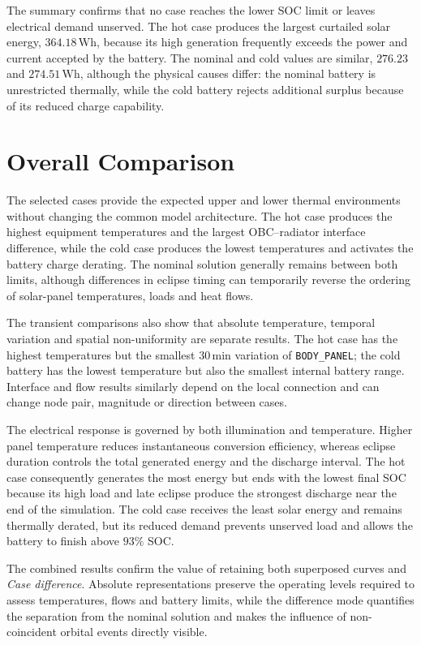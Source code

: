 The summary confirms that no case reaches the lower SOC limit or leaves
electrical demand unserved. The hot case produces the largest curtailed solar
energy, $364.18\,\mathrm{Wh}$, because its high generation frequently exceeds
the power and current accepted by the battery. The nominal and cold values are
similar, $276.23$ and $274.51\,\mathrm{Wh}$, although the physical causes
differ: the nominal battery is unrestricted thermally, while the cold battery
rejects additional surplus because of its reduced charge capability.


\section{Overall Comparison}
\label{sec:overall_comparison}

The selected cases provide the expected upper and lower thermal environments
without changing the common model architecture. The hot case produces the
highest equipment temperatures and the largest OBC--radiator interface
difference, while the cold case produces the lowest temperatures and activates
the battery charge derating. The nominal solution generally remains between
both limits, although differences in eclipse timing can temporarily reverse
the ordering of solar-panel temperatures, loads and heat flows.

The transient comparisons also show that absolute temperature, temporal
variation and spatial non-uniformity are separate results. The hot case has the
highest temperatures but the smallest $30\,\mathrm{min}$ variation of
\texttt{BODY\_PANEL}; the cold battery has the lowest temperature but also the
smallest internal battery range. Interface and flow results similarly depend
on the local connection and can change node pair, magnitude or direction
between cases.

The electrical response is governed by both illumination and temperature.
Higher panel temperature reduces instantaneous conversion efficiency, whereas
eclipse duration controls the total generated energy and the discharge
interval. The hot case consequently generates the most energy but ends with
the lowest final SOC because its high load and late eclipse produce the
strongest discharge near the end of the simulation. The cold case receives
the least solar energy and remains thermally derated, but its reduced demand
prevents unserved load and allows the battery to finish above $93\%$ SOC.

The combined results confirm the value of retaining both superposed curves and
\textit{Case difference}. Absolute representations preserve the operating
levels required to assess temperatures, flows and battery limits, while the
difference mode quantifies the separation from the nominal solution and makes
the influence of non-coincident orbital events directly visible.

\FloatBarrier

